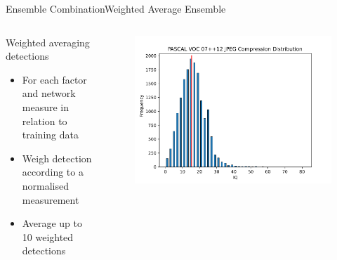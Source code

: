 \begin{frame}{Ensemble Combination}{Weighted Average Ensemble}
\begin{columns}
        \begin{block}{Weighted averaging detections}
        \begin{itemize}
            \item For each factor and network measure in relation to training data
            \item Weigh detection according to a normalised measurement
            \item Average up to 10 weighted detections
        \end{itemize}
    \end{block}
        \begin{figure}
            \includegraphics[width=1.0 \textwidth]{figs/JPEGCompressiondistred.pdf}
        \end{figure}
    \end{columns}
\end{frame}
